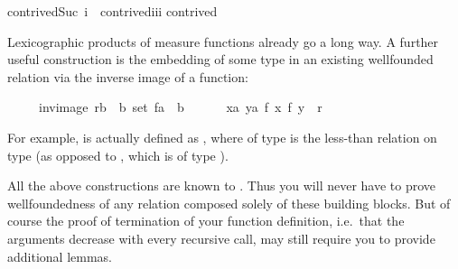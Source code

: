 \begin{isabellebody}
{\isachardoublequote}contrived{\isacharparenleft}Suc\ i{\isacharcomma}{}{\isacharcomma}{}{\isacharparenright}\ {\isacharequal}\ contrived{\isacharparenleft}i{\isacharcomma}i{\isacharcomma}i{\isacharparenright}{\isachardoublequote}\isanewline
{\isachardoublequote}contrived{\isacharparenleft}{}{\isacharcomma}{}{\isacharcomma}{}{\isacharparenright}\ \ \ \ \ {\isacharequal}\ {}{\isachardoublequote}%
\begin{isamarkuptext}%
Lexicographic products of measure functions already go a long way. A
further useful construction is the embedding of some type in an
existing wellfounded relation via the inverse image of a function:
\begin{isabelle}%
\ \ \ \ \ inv{\isacharunderscore}image\ {\isacharparenleft}r{\isasymColon}{\isacharparenleft}{\isacharprime}b\ {\isasymtimes}\ {\isacharprime}b{\isacharparenright}\ set{\isacharparenright}\ {\isacharparenleft}f{\isasymColon}{\isacharprime}a\ {\isasymRightarrow}\ {\isacharprime}b{\isacharparenright}\ {\isasymequiv}\isanewline
\ \ \ \ \ {\isacharbraceleft}{\isacharparenleft}x{\isasymColon}{\isacharprime}a{\isacharcomma}\ y{\isasymColon}{\isacharprime}a{\isacharparenright}{\isachardot}\ {\isacharparenleft}f\ x{\isacharcomma}\ f\ y{\isacharparenright}\ {\isasymin}\ r{\isacharbraceright}%
\end{isabelle}
\begin{sloppypar}
\noindent
For example,  is actually defined as , where
 of type  is the less-than relation on type 
(as opposed to , which is of type ).
\end{sloppypar}


All the above constructions are known to . Thus you
will never have to prove wellfoundedness of any relation composed
solely of these building blocks. But of course the proof of
termination of your function definition, i.e.\ that the arguments
decrease with every recursive call, may still require you to provide
additional lemmas.


\end{isamarkuptext}
\end{isabellebody}
